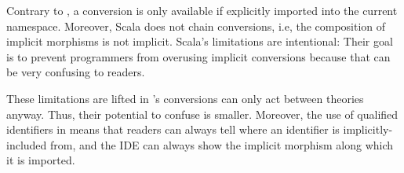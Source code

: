 Contrary to \mmt, a conversion is only available if explicitly imported into the current namespace.
Moreover, Scala does not chain conversions, i.e, the composition of implicit morphisms is not implicit.
Scala's limitations are intentional: Their goal is to prevent programmers from overusing implicit conversions because that can be very confusing to readers.

These limitations are lifted in \mmt's conversions can only act between theories anyway.
Thus, their potential to confuse is smaller.
Moreover, the use of qualified identifiers in \mmt means that readers can always tell where an identifier is implicitly-included from, and the \mmt IDE can always show the implicit morphism along which it is imported.

